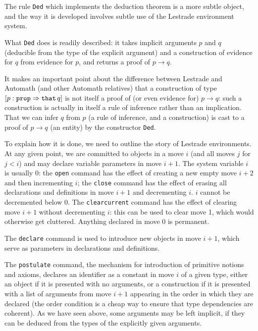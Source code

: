 \documentclass[12pt]{article}
\begin{document}
The rule {\tt Ded} which implements the deduction theorem is a more subtle object, and the way it is developed involves subtle use of the Lestrade environment system.

What {\tt Ded} does is readily described:  it takes implicit arguments $p$ and $q$ (deducible from the type of the explicit argument) and a construction of evidence for $q$ from evidence for $p$, and returns a proof of $p \rightarrow q$.

It makes an important point about the difference between Lestrade and Automath (and other Automath relatives) that a construction of type \newline $[p:{\tt prop} \Rightarrow {\tt that} \,q]$ is not itself a proof of (or even evidence for) $p \rightarrow q$:  such a construction is actually in itself a rule of inference rather than an implication.  That we can infer $q$ from $p$ (a rule of inference, and a construction) is cast to a proof of $p\rightarrow q$ (an entity) by the constructor {\tt Ded}.

To explain how it is done, we need to outline the story of Lestrade environments.  At any given point, we are committed to objects in a move $i$ (and all moves $j$ for $j<i$) and may declare variable parameters in
move $i+1$.  The system variable $i$ is usually 0:  the {\tt open} command has the effect of creating a new empty move $i+2$ and then incrementing $i$;  the {\tt close} command has
the effect of erasing all declarations and definitions in move $i+1$ and decrementing $i$.  $i$ cannot be decremented below 0.  The {\tt clearcurrent} command has the effect
of clearing move $i+1$ without decrementing $i$:  this can be used to clear move 1, which would otherwise get cluttered.  Anything declared in move 0 is permanent.

The {\tt declare} command is used to introduce new objects in move $i+1$, which serve as parameters in declarations and definitions.

The {\tt postulate} command, the mechanism for introduction of primitive notions and axioms,  declares an identifier as a constant in move $i$ of a given type, either an object if it is presented with no arguments, or a construction if it is presented
with a list of arguments from move $i+1$ appearing in the order in which they are declared (the order condition is  a cheap way to ensure that type dependencies are coherent).  As we have seen above, some arguments may be left implicit, if they can be deduced from the types of the explicitly given arguments.
\end{document}
